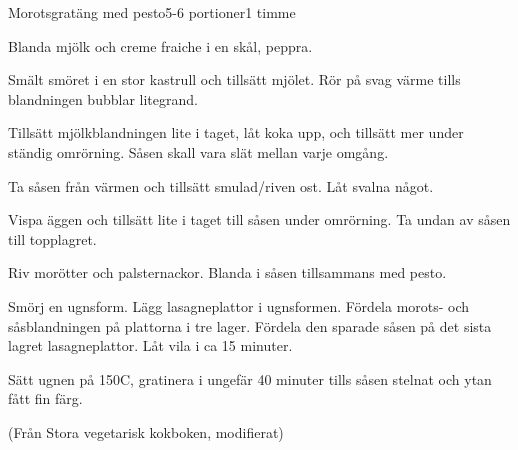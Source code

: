 \documentclass[a4wide, 10pt]{article}
\begin{document}
\begin{recipe}{Morotsgratäng med pesto}{5-6 portioner}{1 timme}


Blanda mjölk och creme fraiche i en skål, peppra.


Smält smöret i en stor kastrull och tillsätt mjölet. Rör på svag värme
tills blandningen bubblar litegrand.

Tillsätt mjölkblandningen lite i taget, låt koka upp, och tillsätt mer
under ständig omrörning. Såsen skall vara slät mellan varje omgång.


Ta såsen från värmen och tillsätt smulad/riven ost. Låt svalna något.

Vispa äggen och tillsätt lite i taget till såsen under omrörning. Ta
undan  av såsen till topplagret.


Riv morötter och palsternackor. Blanda i såsen tillsammans med pesto.


Smörj en ugnsform. Lägg lasagneplattor i ugnsformen. Fördela morots-
och såsblandningen på plattorna i tre lager. Fördela den sparade såsen
på det sista lagret lasagneplattor. Låt vila i ca 15 minuter.

Sätt ugnen på 150\0C, gratinera i ungefär 40 minuter tills såsen
stelnat och ytan fått fin färg.
\end{recipe}

(Från Stora vegetarisk kokboken, modifierat)
\end{document}
